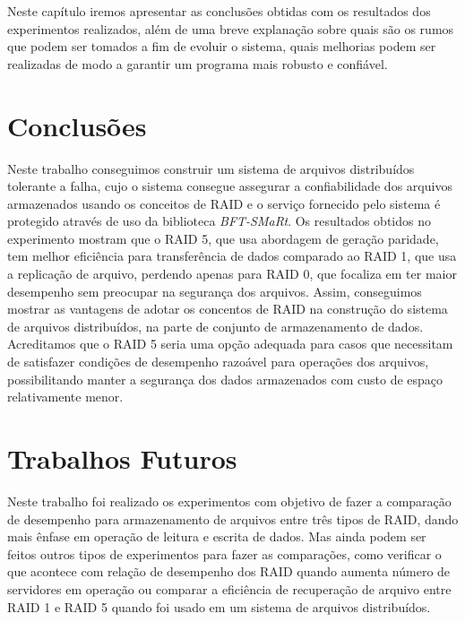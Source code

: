 Neste capítulo iremos apresentar as conclusões obtidas com os resultados dos experimentos realizados, além de uma breve explanação sobre quais são os rumos que podem ser tomados a fim de evoluir o sistema, quais melhorias podem ser realizadas de modo a garantir um programa mais robusto e confiável.
\\

\section{Conclusões}


Neste trabalho conseguimos construir um sistema de arquivos distribuídos tolerante a falha, cujo o sistema consegue assegurar a confiabilidade dos arquivos armazenados usando os conceitos de RAID e o serviço fornecido pelo sistema é protegido através de uso da biblioteca \textit{BFT-SMaRt}.
Os resultados obtidos no experimento mostram que o RAID 5, que usa abordagem de geração paridade, tem melhor eficiência para transferência de dados comparado ao RAID 1, que usa a replicação de arquivo, perdendo apenas para RAID 0, que focaliza em ter maior desempenho sem preocupar na segurança dos arquivos.
Assim, conseguimos mostrar as vantagens de adotar os concentos de RAID na construção do sistema de arquivos distribuídos, na parte de conjunto de armazenamento de dados. Acreditamos que o RAID 5 seria uma opção adequada para casos que necessitam de satisfazer condições de desempenho razoável para operações dos arquivos, possibilitando manter a segurança dos dados armazenados com custo de espaço relativamente menor.
\\


\section{Trabalhos Futuros}

Neste trabalho foi realizado os experimentos com objetivo de fazer a comparação de desempenho para armazenamento de arquivos entre três tipos de RAID, dando mais ênfase em operação de leitura e escrita de dados.
Mas ainda podem ser feitos outros tipos de experimentos para fazer as comparações, como verificar o que acontece com relação de desempenho dos RAID quando aumenta número de servidores em operação ou comparar a eficiência de recuperação de arquivo entre RAID 1 e RAID 5 quando foi usado em um sistema de arquivos distribuídos. 
\\

